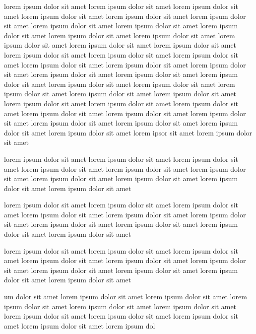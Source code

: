 \unnsubsection{\caddadaptationtitle}%
\label{sec:discussion_caddadaptation}%
lorem ipsum dolor sit amet lorem ipsum dolor sit amet lorem ipsum dolor sit amet
lorem ipsum dolor sit amet lorem ipsum dolor sit amet 
lorem ipsum dolor sit amet lorem ipsum dolor sit amet lorem ipsum dolor sit amet
lorem ipsum dolor sit amet lorem ipsum dolor sit amet 
lorem ipsum dolor sit amet lorem ipsum dolor sit amet lorem ipsum dolor sit amet
lorem ipsum dolor sit amet lorem ipsum dolor sit amet 
lorem ipsum dolor sit amet lorem ipsum dolor sit amet lorem ipsum dolor sit amet
lorem ipsum dolor sit amet lorem ipsum dolor sit amet 
lorem ipsum dolor sit amet lorem ipsum dolor sit amet lorem ipsum dolor sit amet
lorem ipsum dolor sit amet lorem ipsum dolor sit amet 
lorem ipsum dolor sit amet lorem ipsum dolor sit amet lorem ipsum dolor sit amet
lorem ipsum dolor sit amet lorem ipsum dolor sit amet 
lorem ipsum dolor sit amet lorem ipsum dolor sit amet lorem ipsum dolor sit amet
lorem ipsum dolor sit amet lorem ipsum dolor sit amet 
lorem ipsum dolor sit amet lorem ipsum dolor sit amet lorem ipsum dolor sit amet
lorem ipsor sit amet lorem ipsum dolor sit amet 


lorem ipsum dolor sit amet lorem ipsum dolor sit amet lorem ipsum dolor sit amet
lorem ipsum dolor sit amet lorem ipsum dolor sit amet 
lorem ipsum dolor sit amet lorem ipsum dolor sit amet lorem ipsum dolor sit amet
lorem ipsum dolor sit amet lorem ipsum dolor sit amet 


lorem ipsum dolor sit amet lorem ipsum dolor sit amet lorem ipsum dolor sit amet
lorem ipsum dolor sit amet lorem ipsum dolor sit amet 
lorem ipsum dolor sit amet lorem ipsum dolor sit amet lorem ipsum dolor sit amet
lorem ipsum dolor sit amet lorem ipsum dolor sit amet 


lorem ipsum dolor sit amet lorem ipsum dolor sit amet lorem ipsum dolor sit amet
lorem ipsum dolor sit amet lorem ipsum dolor sit amet 
lorem ipsum dolor sit amet lorem ipsum dolor sit amet lorem ipsum dolor sit amet
lorem ipsum dolor sit amet lorem ipsum dolor sit amet 

um dolor sit amet lorem ipsum dolor sit amet 
lorem ipsum dolor sit amet lorem ipsum dolor sit amet lorem ipsum dolor sit amet
lorem ipsum dolor sit amet lorem ipsum dolor sit amet 
lorem ipsum dolor sit amet lorem ipsum dolor sit amet lorem ipsum dolor sit amet
lorem ipsum dol





